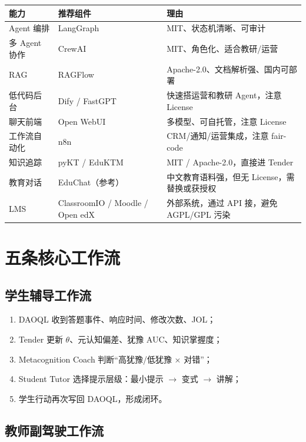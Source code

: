 \documentclass[UTF8,a4paper,11pt]{ctexart}
\begin{document}
\begin{center}
\begin{longtable}{@{}p{3.4cm}p{4.4cm}p{6.0cm}@{}}
\toprule
\textbf{能力} & \textbf{推荐组件} & \textbf{理由} \\
\midrule
Agent 编排 & LangGraph & MIT、状态机清晰、可审计 \\
多 Agent 协作 & CrewAI & MIT、角色化、适合教研/运营 \\
RAG & RAGFlow & Apache-2.0、文档解析强、国内可部署 \\
低代码后台 & Dify / FastGPT & 快速搭运营和教研 Agent，注意 License \\
聊天前端 & Open WebUI & 多模型、可自托管，注意 License \\
工作流自动化 & n8n & CRM/通知/运营集成，注意 fair-code \\
知识追踪 & pyKT / EduKTM & MIT / Apache-2.0，直接进 Tender \\
教育对话 & EduChat（参考） & 中文教育语料强，但无 License，需替换或获授权 \\
LMS & ClassroomIO / Moodle / Open edX & 外部系统，通过 API 接，避免 AGPL/GPL 污染 \\
\bottomrule
\end{longtable}
\end{center}

\section{五条核心工作流}

\subsection{学生辅导工作流}

\begin{enumerate}[leftmargin=2em]
\item DAOQL 收到答题事件、响应时间、修改次数、JOL；
\item Tender 更新 $\theta$、元认知偏差、犹豫 AUC、知识掌握度；
\item Metacognition Coach 判断“高犹豫/低犹豫 × 对错”；
\item Student Tutor 选择提示层级：最小提示 $\to$ 变式 $\to$ 讲解；
\item 学生行动再次写回 DAOQL，形成闭环。
\end{enumerate}

\subsection{教师副驾驶工作流}
\end{document}
